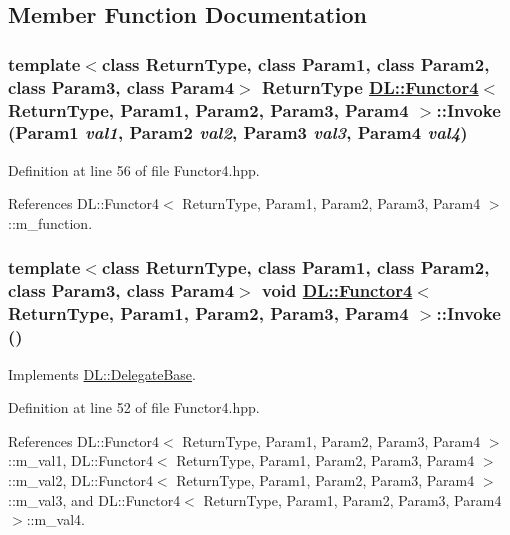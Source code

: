 \subsection{Member Function Documentation}
\hypertarget{classDL_1_1Functor4_a3}{
\subsubsection[Invoke]{\setlength{\rightskip}{0pt plus 5cm}template$<$class Return\-Type, class Param1, class Param2, class Param3, class Param4$>$ Return\-Type \hyperlink{classDL_1_1Functor4}{DL::Functor4}$<$ Return\-Type, Param1, Param2, Param3, Param4 $>$::Invoke (Param1 {\em val1}, Param2 {\em val2}, Param3 {\em val3}, Param4 {\em val4})}}
\label{classDL_1_1Functor4_a3}




Definition at line 56 of file Functor4.hpp.

References DL::Functor4$<$ Return\-Type, Param1, Param2, Param3, Param4 $>$::m\_\-function.\hypertarget{classDL_1_1Functor4_a2}{
\subsubsection[Invoke]{\setlength{\rightskip}{0pt plus 5cm}template$<$class Return\-Type, class Param1, class Param2, class Param3, class Param4$>$ void \hyperlink{classDL_1_1Functor4}{DL::Functor4}$<$ Return\-Type, Param1, Param2, Param3, Param4 $>$::Invoke ()}}
\label{classDL_1_1Functor4_a2}




Implements \hyperlink{classDL_1_1DelegateBase_a2}{DL::Delegate\-Base}.

Definition at line 52 of file Functor4.hpp.

References DL::Functor4$<$ Return\-Type, Param1, Param2, Param3, Param4 $>$::m\_\-val1, DL::Functor4$<$ Return\-Type, Param1, Param2, Param3, Param4 $>$::m\_\-val2, DL::Functor4$<$ Return\-Type, Param1, Param2, Param3, Param4 $>$::m\_\-val3, and DL::Functor4$<$ Return\-Type, Param1, Param2, Param3, Param4 $>$::m\_\-val4.

